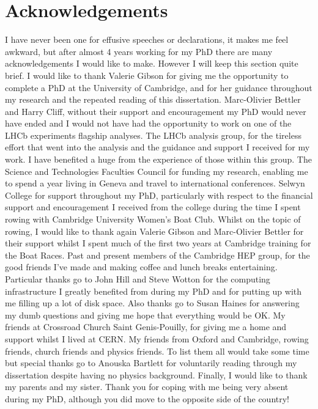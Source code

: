 




\chapter{Acknowledgements}

I have never been one for effusive speeches or declarations, it makes me feel awkward, but after almost 4 years working for my PhD there are many acknowledgements I would like to make. However I will keep this section quite brief.
I would like to thank Valerie Gibson for giving me the opportunity to complete a PhD at the University of Cambridge, and for her guidance throughout my research and the repeated reading of this dissertation. %
Marc-Olivier Bettler and Harry Cliff, without their support and encouragement my PhD would never have ended and I would not have had the opportunity to work on one of the LHCb experiments flagship analyses.
The \bmumu LHCb analysis group, for the tireless effort that went into the \BF analysis and the guidance and support I received for my work. I have benefited a huge from the experience of those within this group. 
The Science and Technologies Faculties Council for funding my research, enabling me to spend a year living in Geneva and travel to international conferences. Selwyn College for support throughout my PhD, particularly with respect to the financial support and encouragement I received from the college during the time I spent rowing with Cambridge University Women's Boat Club. Whilst on the topic of rowing, I would like to thank again Valerie Gibson and Marc-Olivier Bettler for their support whilst I spent much of the first two years at Cambridge training for the Boat Races. 
Past and present members of the Cambridge HEP group, for the good friends I've made and making coffee and lunch breaks entertaining. Particular thanks go to John Hill and Steve Wotton for the computing infrastructure I greatly benefited from during my PhD and for putting up with me filling up a lot of disk space. Also thanks go to Susan Haines for answering my dumb questions and giving me hope that everything would be OK. 
My friends at Crossroad Church Saint Genis-Pouilly, for giving me a home and support whilst I lived at CERN.
My friends from Oxford and Cambridge, rowing friends, church friends and physics friends. To list them all would take some time but special thanks go to Anouska Bartlett for voluntarily reading through my dissertation despite having no physics background. 
Finally, I would like to thank my parents and my sister. Thank you for coping with me being very absent during my PhD, although you did move to the opposite side of the country! 


